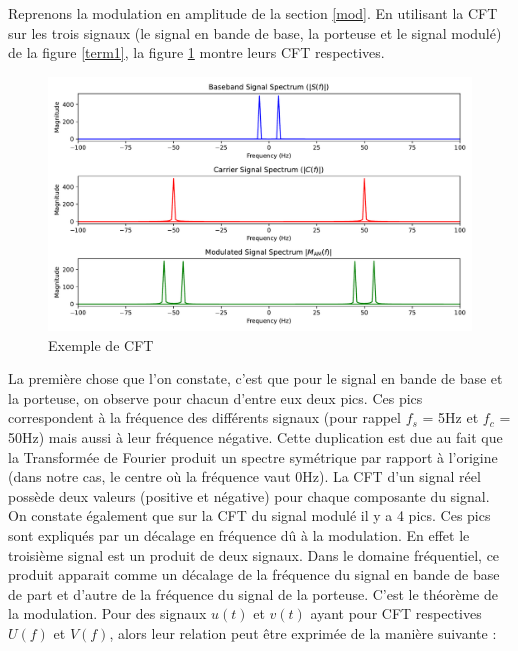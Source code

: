 \vspace{0.1cm}

Reprenons la modulation en amplitude de la section \ref{mod}. En utilisant la \ac{CFT} sur les trois signaux (le signal en bande de base, la porteuse et le signal modulé) de la figure \ref{term1}, la figure \ref{term8} montre leurs CFT respectives.

\newpage

\begin{figure}[h]
\centering

\includegraphics[scale=0.5]{images/CFT.pdf}
\caption{Exemple de CFT}\label{term8}
\end{figure}

La première chose que l'on constate, c'est que pour le signal en bande de base et la porteuse, on observe pour chacun d'entre eux deux pics. Ces pics correspondent à la fréquence des différents signaux (pour rappel $f_s$ = 5Hz et $f_c$ = 50Hz) mais aussi à leur fréquence négative. Cette duplication est due au fait que la Transformée de Fourier produit un spectre symétrique par rapport à l'origine (dans notre cas, le centre où la fréquence vaut 0Hz). La CFT d'un signal réel possède deux valeurs (positive et négative) pour chaque composante du signal. On constate également que sur la CFT du signal modulé il y a 4 pics. Ces pics sont expliqués par un décalage en fréquence dû à la modulation. En effet le troisième signal est un produit de deux signaux. Dans le domaine fréquentiel, ce produit apparait comme un décalage de la fréquence du signal en bande de base de part et d'autre de la fréquence du signal de la porteuse. C'est le théorème de la modulation. Pour des signaux $u(t)$ et $v(t)$ ayant pour CFT respectives $U(f)$ et $V(f)$, alors leur relation peut être exprimée de la manière suivante :

